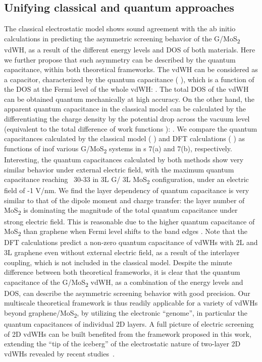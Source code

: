 \subsection{Unifying classical and quantum approaches}
\label{sec:asym-unify}
The classical electrostatic model shows sound agreement with the ab
initio calculations in predicting the asymmetric screening behavior of
the G/MoS\textsubscript{2} vdWH, as a result of the different energy levels and DOS of
both materials. Here we further propose that such asymmetry can be
described by the quantum capacitance, within both theoretical
frameworks. The vdWH can be considered as a capacitor, characterized
by the quantum capacitance ( ), which is a function of the DOS at the
Fermi level of the whole vdWH: . The total DOS of the vdWH can be
obtained quantum mechanically at high accuracy. On the other hand, the
apparent quantum capacitance in the classical model can be calculated
by the differentiating the charge density by the potential drop across
the vacuum level (equivalent to the total difference of work functions
): . We compare the quantum capacitances calculated by the classical
model ( ) and DFT calculations ( ) as functions of inof various G/MoS\textsubscript{2}
systems in s 7(a) and 7(b), respectively. Interesting, the
quantum capacitances calculated by both methods show very similar
behavior under external electric field, with the maximum quantum
capacitance reaching ~30-33 in 3L G/ 3L MoS\textsubscript{2} configuration, under an
electric field of -1 V/nm. We find the layer dependency of quantum
capacitance is very similar to that of the dipole moment and charge
transfer: the layer number of MoS\textsubscript{2} is dominating the magnitude of the
total quantum capacitance under strong electric field. This is
reasonable due to the higher quantum capacitance of MoS\textsubscript{2} than graphene
when Fermi level shifts to the band edges .
%
Note that the DFT calculations predict a non-zero quantum capacitance
of vdWHs with 2L and 3L graphene even without external electric field,
as a result of the interlayer coupling, which is not included in the
classical model. Despite the minute difference between both
theoretical frameworks, it is clear that the quantum capacitance of
the G/MoS\textsubscript{2} vdWH, as a combination of the energy levels and DOS, can
describe the asymmetric screening behavior with good precision. Our
multiscale theoretical framework is thus readily applicable for a
variety of vdWHs beyond graphene/MoS\textsubscript{2}, by utilizing the electronic
“genome”, in particular the quantum capacitances of individual 2D
layers. A full picture of electric screening of 2D vdWHs can be built
benefited from the framework proposed in this work, extending the “tip
of the iceberg” of the electrostatic nature of two-layer 2D vdWHs
revealed by recent
studies~\cite{Chu_2017_eh_tunneling,Lee_2014_pn_vdw_het,Furchi_2014_PV_vdwH}.

